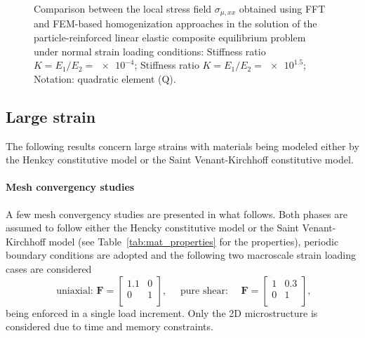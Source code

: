 \begin{figure}[hbt]
\begin{subfigure}[b]{\textwidth}
    \caption{}
    \label{subfig:linear_3D_ratio_-4_normal_stress_11}
  \end{subfigure}
  \caption{Comparison between the local stress field \(\sigma_{\mu,xx}\) obtained using
  FFT and FEM-based homogenization approaches in the solution of the particle-reinforced
  linear elastic composite equilibrium problem under normal strain loading conditions:
   Stiffness ratio \(K=E_1/E_2=\num{e-4}\);
   Stiffness ratio \(K=E_1/E_2=\num{e1.5}\);
  Notation: quadratic element (Q).}
\label{fig:linear_3D_stiff_contrast_normal_stress_11}
\end{figure}


\FloatBarrier

\subsection{Large strain}

The following results concern large strains with materials being modeled either by the Henkcy constitutive model or the Saint Venant-Kirchhoff constitutive model.

\paragraph{Mesh convergency studies}

A few mesh convergency studies are presented in what follows.
Both phases are assumed to follow either the Hencky constitutive model or the Saint Venant-Kirchhoff model (see Table~\ref{tab:mat_properties} for the properties), periodic boundary conditions are adopted and the following two macroscale strain loading cases are considered
\begin{equation}
\text { uniaxial: } \bm{F}=\left[\begin{array}{ll}
1.1 & 0 \\
0 & 1  \\
\end{array}\right], \quad \text { pure shear: } \quad \bm F=\left[\begin{array}{cc}
1 & 0.3 \\
0 & 1  \\
\end{array}\right],
\end{equation}
being enforced in a single load increment.
Only the 2D microstructure is considered due to time and memory constraints.

